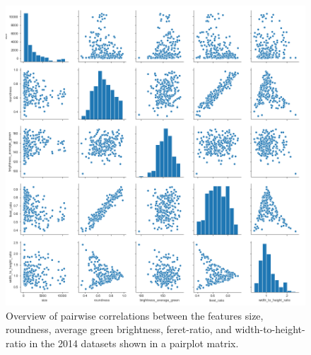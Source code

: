 \documentclass[paper=A4,bibliography=totocnumbered]{scrartcl}
\begin{document}
\begin{figure}
	\centering
	\includegraphics[width=13cm]{pic/overview}
	\caption{Overview of pairwise correlations between the features size, roundness, average green brightness, feret-ratio, and width-to-height-ratio in the 2014 datasets shown in a pairplot matrix.}
	\label{fig:overview}
\end{figure}
\end{document}

